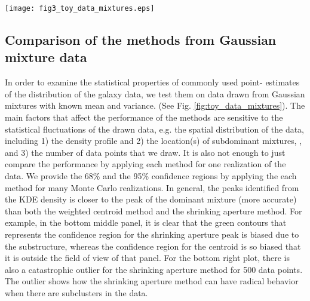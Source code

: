 \begin{figure*}
	\texttt{[image: fig3\_toy\_data\_mixtures.eps]}
	\caption{Comparison of peak finding performances of different methods by
		drawing data points (i.e. 20, 50, 100, 500) from known number of 
		Gaussian mixtures. 
		Panels from the top row contain data drawn from a single Gaussian mixture. The
		panels from the middle row contain data from two 
		 Gaussian mixtures with weight ratio = 7:3. 
	The panels from the bottom row contain data drawn from three Gaussian
	mixtures with weight ratio = 55:35:10. 
	The left column shows how 50 data points drawn from the fixed number of 
	Gaussian mixtures look like. 
	Due to the statistical nature of this exercise, we sampled the data and
	performed the analyses [TODO: state how many times] many times to
	create the (68\% and 95\%) confidence contours of the estimates in the
	zoomed-in view of the data in the middle
	column. The rightmost column shows how the size (median contour radius) 
	of the confidence regions vary as a
	function of the number of drawn data points from the Gaussian mixtures. 
	From the middle and the rightmost
	column, we can tell that the KDE peak estimate is the most accurate but less
	precise for estimating the sampled data from each set of data. 
		\label{fig:toy_data_mixtures}}
\end{figure*}



\subsection{Comparison of the methods from Gaussian mixture data}
In order to examine the statistical properties of commonly used point-
estimates of the distribution of the galaxy data, we test them on data drawn 
from Gaussian mixtures with known mean and variance. (See Fig.
\ref{fig:toy_data_mixtures}). The main factors that affect the performance of 
the methods are sensitive to the statistical fluctuations of the drawn data, 
e.g. the
spatial distribution of the data, including 1) the density profile and 2) the
location(s) of subdominant mixtures,
, and 3) the number of data points that we draw.
It is also not enough to just
compare the performance by applying each method for one realization of the
data. We provide the 68\% and the 95\% confidence regions by applying the
each method for many Monte Carlo realizations.
In general, the peaks identified from the KDE density is closer to the 
peak of the dominant mixture (more accurate) than 
both the weighted centroid method and the shrinking aperture method.
For example, in the bottom middle panel, it is clear that the green contours
that represents the confidence region for the shrinking aperture peak is
biased due to the substructure, whereas the confidence region for the centroid 
is so biased that it is
outside the field of view of that panel.
For the bottom right plot, there is also a catastrophic outlier for the shrinking 
aperture method for 500 data
points. The outlier shows how the shrinking aperture method can have
radical behavior when there are subclusters in the data.	

